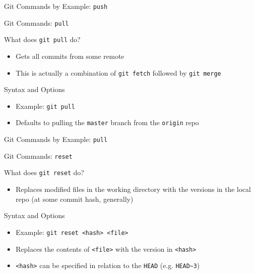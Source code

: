 \documentclass[table,dvipsnames]{beamer}
\begin{document}

\begin{frame}{Git Commands by Example: \texttt{push}}
\end{frame}

\begin{frame}{Git Commands: \texttt{pull}}
	\begin{block}{What does \texttt{git pull} do?}
		\begin{itemize}
			\item Gets all commits from some remote
			\item This is actually a combination of \texttt{git fetch} followed
				by \texttt{git merge}
		\end{itemize}
	\end{block}
	\begin{block}{Syntax and Options}
		\begin{itemize}
			\item Example: \texttt{git pull}
			\item Defaults to pulling the \texttt{master} branch from the 
				\texttt{origin} repo
		\end{itemize}
	\end{block}
\end{frame}


\begin{frame}{Git Commands by Example: \texttt{pull}}
\end{frame}


\begin{frame}{Git Commands: \texttt{reset}}
	\begin{block}{What does \texttt{git reset} do?}
		\begin{itemize}
			\item Replaces modified files in the working directory with the 
				versions in the local repo (at some commit hash, generally)
		\end{itemize}
	\end{block}
	\begin{block}{Syntax and Options}
		\begin{itemize}
			\item Example: \texttt{git reset <hash> <file>}
			\item Replaces the contents of \texttt{<file>} with the version in 
				\texttt{<hash>}
			\item \texttt{<hash>} can be specified in relation to the \texttt{HEAD} (e.g.
				\texttt{HEAD\~{}3})
		\end{itemize}
	\end{block}
\end{frame}
\end{document}
